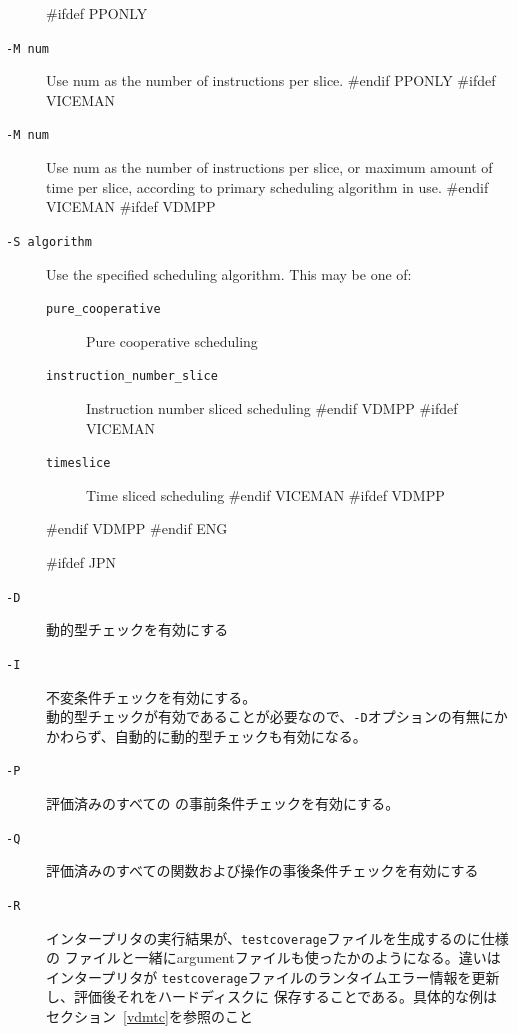 \documentclass[\pformat,12pt]{article}
\begin{document}
\begin{description}
#ifdef PPONLY
\item[{\tt -M num}] Use num as the number of instructions per slice.
#endif PPONLY
#ifdef VICEMAN
\item[{\tt -M num}] Use num as the number of instructions per slice,
 or maximum amount of time per slice, according to primary scheduling algorithm in use.
#endif VICEMAN
#ifdef VDMPP
\item[{\tt -S algorithm}] Use the specified scheduling algorithm. This may be one of:
  \begin{description}
  \item[{\tt pure\_cooperative}] Pure cooperative scheduling
  \item[{\tt instruction\_number\_slice}] Instruction number sliced scheduling
#endif VDMPP
#ifdef VICEMAN
  \item[{\tt timeslice}] Time sliced scheduling
#endif VICEMAN
#ifdef VDMPP
  \end{description}
#endif VDMPP
#endif ENG

#ifdef JPN
\item[{\tt -D}] 動的型チェックを有効にする
  
\item[{\tt -I}] 不変条件チェックを有効にする。 \\
  動的型チェックが有効であることが必要なので、{\tt -D}オプションの有無にかかわらず、自動的に動的型チェックも有効になる。\\

\item[{\tt -P}]
評価済みのすべての
の事前条件チェックを有効にする。

\item[{\tt -Q}]
評価済みのすべての関数および操作の事後条件チェックを有効にする

\item[{\tt -R}]
  インタープリタの実行結果が、{\tt testcoverage}ファイルを生成するのに仕様の
  ファイルと一緒にargumentファイルも使ったかのようになる。違いはインタープリタが
  {\tt testcoverage}ファイルのランタイムエラー情報を更新し、評価後それをハードディスクに
  保存することである。具体的な例はセクション~\ref{vdmtc}を参照のこと
  

\end{description}
\end{document}
